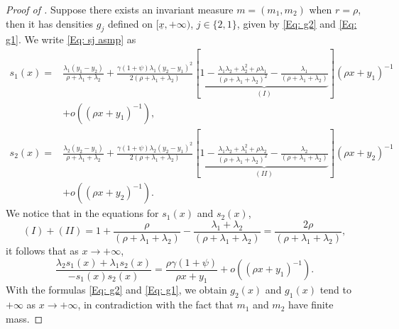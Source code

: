 \documentclass[11pt]{article}
\numberwithin{equation}{section}
\theoremstyle{definition}
\newcommand{\ux}{{\underline x}}
\newcommand{\ld}{\lambda}
\newcommand{\g}{\gamma}
\newcommand{\p}{\psi}
\theoremstyle{plain}
\begin{document}
\begin{appendices}
\begin{proof}[Proof of ]
Suppose there exists an invariant measure $m=(m_1,m_2)$ when $r=\rho$, then it has densities $g_j$ defined on $[\ux,+\infty)$, $j\in \{2,1\}$, given by \cref{Eq: g2} and \cref{Eq: g1}. We write \cref{Eq: sj asmp} as 
\begin{align*}
s_1(x)={}&\frac{\lambda_1(y_{1}-y_2)}{\rho+\lambda_1+\lambda_{2}}+\frac{\g (1+\p)\lambda_1(y_2-y_1)^2}{2(\rho+\lambda_1+\lambda_2)}\left[\underbrace{1-\frac{\lambda_1\lambda_2+\lambda_2^2+\rho \lambda_1}{(\rho+\lambda_1+\lambda_2)^2}-\frac{\lambda_1}{(\rho+\lambda_1+\lambda_2)}}_{(I)}\right](\rho x+y_1)^{-1}\\
&+o((\rho x+y_1)^{-1}),\\
s_2(x)={}&\frac{\lambda_2(y_{2}-y_1)}{\rho+\lambda_1+\lambda_{2}}+\frac{\g (1+\p)\lambda_2(y_2-y_1)^2}{2(\rho+\lambda_1+\lambda_2)}\left[\underbrace{1-\frac{\lambda_1\lambda_2+\lambda_1^2+\rho \lambda_2}{(\rho+\lambda_1+\lambda_2)^2}-\frac{\lambda_2}{(\rho+\lambda_1+\lambda_2)}}_{(II)}\right](\rho x+y_2)^{-1}\\
&+o((\rho x+y_2)^{-1}).
 \end{align*}
We notice that in the equations for $s_1(x)$ and $s_2(x)$,
$$
(I)+(II)=1+\frac{\rho}{(\rho+\lambda_1+\lambda_2)}-\frac{\lambda_1+\lambda_2}{(\rho+\lambda_1+\lambda_2)}=\frac{2\rho}{(\rho+\lambda_1+\lambda_2)},
$$
it follows that as $x\to +\infty$, 
$$
\frac{\ld_2s_1(x)+\ld_1s_2(x)}{-s_1(x)s_2(x)}=\frac{\rho \g(1+\p)}{\rho x+y_1}+o((\rho x+y_1)^{-1}).
$$
With the formulas \cref{Eq: g2} and \cref{Eq: g1}, we obtain $g_2(x)$ and $g_1(x)$ tend to $+\infty$ as $x\to +\infty$, in contradiction with the fact that $m_1$ and $m_2$ have finite mass. 
 \end{proof}


\end{appendices}
\end{document}
